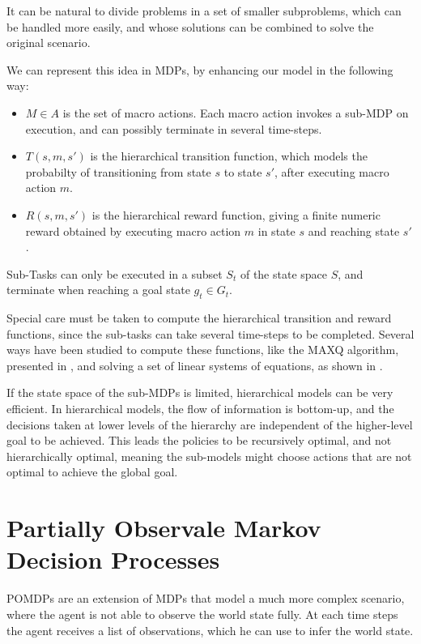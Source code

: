 It can be natural to divide problems in a set of smaller subproblems, which can be handled more easily, and whose solutions can be combined to solve the original scenario. 

We can represent this idea in MDPs, by enhancing our model in the following way:
\begin{itemize}
\item $M \in A$ is the set of macro actions. Each macro action invokes a sub-MDP on execution, and can possibly terminate in several time-steps.
\item  $T(s,m,s')$ is the hierarchical transition function, which models the probabilty of transitioning from state $s$ to state $s'$, after executing macro action $m$.
\item $R(s,m,s')$ is the hierarchical reward function, giving a finite numeric reward obtained by executing macro action $m$ in state $s$ and reaching state $s'$.
\end{itemize}

Sub-Tasks can only be executed in a subset $S_t$ of the state space $S$, and terminate when reaching a goal state $g_t \in G_t$.

Special care must be taken to compute the hierarchical transition and reward functions, since the sub-tasks can take several time-steps to be completed. Several ways have been studied to compute these functions, like the MAXQ algorithm, presented in \cite{dietterich2000hierarchical}, and solving a set of linear systems of equations, as shown in \cite{hauskrecht1998hierarchical}.

If the state space of the sub-MDPs is limited, hierarchical models can be very efficient. In hierarchical models, the flow of information is bottom-up, and the decisions taken at lower levels of the hierarchy are independent of the higher-level goal to be achieved. This leads the policies to be recursively optimal, and not hierarchically optimal, meaning the sub-models might choose actions that are not optimal to achieve the global goal.

\section{Partially Observale Markov Decision Processes}
\label{sec:methods-pomdp}


POMDPs are an extension of MDPs that model a much more complex scenario, where the agent is not able to observe the world state fully. At each time steps the agent receives a list of observations, which he can use to infer the world state.


